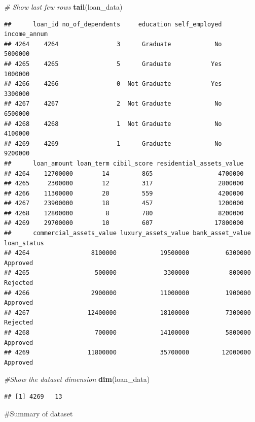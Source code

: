 \documentclass[
]{article}
\newenvironment{Shaded}{\begin{snugshade}}{\end{snugshade}}
\newcommand{\CommentTok}[1]{\textcolor[rgb]{0.56,0.35,0.01}{\textit{#1}}}
\newcommand{\FunctionTok}[1]{\textcolor[rgb]{0.13,0.29,0.53}{\textbf{#1}}}
\newcommand{\NormalTok}[1]{#1}
\begin{document}
\begin{Shaded}
\begin{Highlighting}[]
\CommentTok{\# Show last few rows}
\FunctionTok{tail}\NormalTok{(loan\_data)}
\end{Highlighting}
\end{Shaded}

\begin{verbatim}
##      loan_id no_of_dependents     education self_employed income_annum
## 4264    4264                3      Graduate            No      5000000
## 4265    4265                5      Graduate           Yes      1000000
## 4266    4266                0  Not Graduate           Yes      3300000
## 4267    4267                2  Not Graduate            No      6500000
## 4268    4268                1  Not Graduate            No      4100000
## 4269    4269                1      Graduate            No      9200000
##      loan_amount loan_term cibil_score residential_assets_value
## 4264    12700000        14         865                  4700000
## 4265     2300000        12         317                  2800000
## 4266    11300000        20         559                  4200000
## 4267    23900000        18         457                  1200000
## 4268    12800000         8         780                  8200000
## 4269    29700000        10         607                 17800000
##      commercial_assets_value luxury_assets_value bank_asset_value loan_status
## 4264                 8100000            19500000          6300000    Approved
## 4265                  500000             3300000           800000    Rejected
## 4266                 2900000            11000000          1900000    Approved
## 4267                12400000            18100000          7300000    Rejected
## 4268                  700000            14100000          5800000    Approved
## 4269                11800000            35700000         12000000    Approved
\end{verbatim}

\begin{Shaded}
\begin{Highlighting}[]
\CommentTok{\#Show the dataset dimension }
\FunctionTok{dim}\NormalTok{(loan\_data)}
\end{Highlighting}
\end{Shaded}

\begin{verbatim}
## [1] 4269   13
\end{verbatim}

\#Summary of dataset
\end{document}
